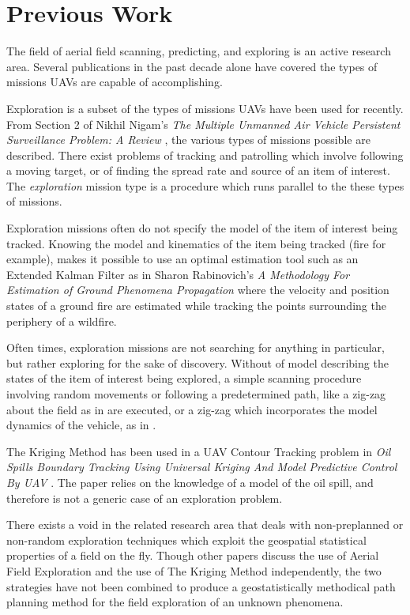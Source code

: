 
\chapter{Previous Work}
The field of aerial field scanning, predicting, and exploring is an active research area. Several publications in the past decade alone have covered the types of missions UAVs are capable of accomplishing.

Exploration is a subset of the types of missions UAVs have been used for recently. From Section 2 of Nikhil Nigam's \textit{The Multiple Unmanned Air Vehicle Persistent Surveillance Problem: A Review} \cite{nigam:missions}, the various types of missions possible are described. There exist problems of tracking and patrolling which involve following a moving target, or of finding the spread rate and source of an item of interest. The \textit{exploration} mission type is a procedure which runs parallel to the these types of missions. 

Exploration missions often do not specify the model of the item of interest being tracked. Knowing the model and kinematics of the item being tracked (fire for example), makes it possible to use an optimal estimation tool such as an Extended Kalman Filter as in Sharon Rabinovich's \textit{A Methodology For Estimation of Ground Phenomena Propagation} \cite{sharon:uav_est} where the velocity and position states of a ground fire are estimated while tracking the points surrounding the periphery of a wildfire.

Often times, exploration missions are not searching for anything in particular, but rather exploring for the sake of discovery. Without of model describing the states of the item of interest being explored, a simple scanning procedure involving random movements or following a predetermined path, like a zig-zag about the field as in \cite{semsch:uav_zig} are executed, or a zig-zag which incorporates the model dynamics of the vehicle, as in \cite{nigam:zigzag}. 

The Kriging Method has been used in a UAV Contour Tracking problem in \textit{Oil Spills Boundary Tracking Using Universal Kriging And Model Predictive Control By UAV} \cite{zhang:oil_krig}. The paper relies on the knowledge of a model of the oil spill, and therefore is not a generic case of an exploration problem. 

There exists a void in the related research area that deals with non-preplanned or non-random exploration techniques which exploit the geospatial statistical properties of a field on the fly. Though other papers discuss the use of Aerial Field Exploration and the use of The Kriging Method independently, the two strategies have not been combined to produce a geostatistically methodical path planning method for the field exploration of an unknown phenomena.